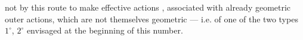 not by this route to make effective actions , associated with  already geometric outer actions, which are not themselves geometric --- i.e. of one of the two types $1^\circ$, $2^\circ$ envisaged at the beginning of this number.
